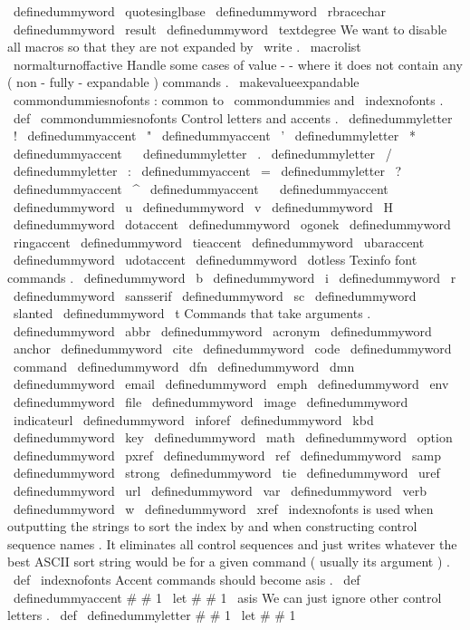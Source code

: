 {{{{{\
definedummyword
\
quotesinglbase
\
definedummyword
\
rbracechar
\
definedummyword
\
result
\
definedummyword
\
textdegree
%
%
We
want
to
disable
all
macros
so
that
they
are
not
expanded
by
\
write
.
\
macrolist
%
\
normalturnoffactive
%
%
Handle
some
cases
of
value
-
-
where
it
does
not
contain
any
%
(
non
-
fully
-
expandable
)
commands
.
\
makevalueexpandable
}
%
\
commondummiesnofonts
:
common
to
\
commondummies
and
\
indexnofonts
.
%
\
def
\
commondummiesnofonts
{
%
%
Control
letters
and
accents
.
\
definedummyletter
\
!
%
\
definedummyaccent
\
"
%
\
definedummyaccent
\
'
%
\
definedummyletter
\
*
%
\
definedummyaccent
\
%
\
definedummyletter
\
.
%
\
definedummyletter
\
/
%
\
definedummyletter
\
:
%
\
definedummyaccent
\
=
%
\
definedummyletter
\
?
%
\
definedummyaccent
\
^
%
\
definedummyaccent
\
%
\
definedummyaccent
\
~
%
\
definedummyword
\
u
\
definedummyword
\
v
\
definedummyword
\
H
\
definedummyword
\
dotaccent
\
definedummyword
\
ogonek
\
definedummyword
\
ringaccent
\
definedummyword
\
tieaccent
\
definedummyword
\
ubaraccent
\
definedummyword
\
udotaccent
\
definedummyword
\
dotless
%
%
Texinfo
font
commands
.
\
definedummyword
\
b
\
definedummyword
\
i
\
definedummyword
\
r
\
definedummyword
\
sansserif
\
definedummyword
\
sc
\
definedummyword
\
slanted
\
definedummyword
\
t
%
%
Commands
that
take
arguments
.
\
definedummyword
\
abbr
\
definedummyword
\
acronym
\
definedummyword
\
anchor
\
definedummyword
\
cite
\
definedummyword
\
code
\
definedummyword
\
command
\
definedummyword
\
dfn
\
definedummyword
\
dmn
\
definedummyword
\
email
\
definedummyword
\
emph
\
definedummyword
\
env
\
definedummyword
\
file
\
definedummyword
\
image
\
definedummyword
\
indicateurl
\
definedummyword
\
inforef
\
definedummyword
\
kbd
\
definedummyword
\
key
\
definedummyword
\
math
\
definedummyword
\
option
\
definedummyword
\
pxref
\
definedummyword
\
ref
\
definedummyword
\
samp
\
definedummyword
\
strong
\
definedummyword
\
tie
\
definedummyword
\
uref
\
definedummyword
\
url
\
definedummyword
\
var
\
definedummyword
\
verb
\
definedummyword
\
w
\
definedummyword
\
xref
}
%
\
indexnofonts
is
used
when
outputting
the
strings
to
sort
the
index
%
by
and
when
constructing
control
sequence
names
.
It
eliminates
all
%
control
sequences
and
just
writes
whatever
the
best
ASCII
sort
string
%
would
be
for
a
given
command
(
usually
its
argument
)
.
%
\
def
\
indexnofonts
{
%
%
Accent
commands
should
become
asis
.
\
def
\
definedummyaccent
#
#
1
{
\
let
#
#
1
\
asis
}
%
%
We
can
just
ignore
other
control
letters
.
\
def
\
definedummyletter
#
#
1
{
\
let
#
#
1
\
}}}}}}
